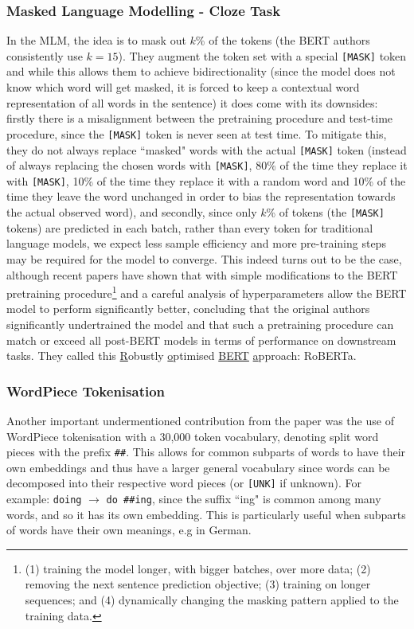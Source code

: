 {{\subsubsection{Masked Language Modelling - Cloze Task}
In the MLM, the idea is to mask out $k$\% of the tokens (the BERT authors consistently use $k=15$). They augment the token set with a special \texttt{[MASK]} token and while this allows them to achieve bidirectionality (since the model does not know which word will get masked, it is forced to keep a contextual word representation of all words in the sentence) it does come with its downsides: firstly there is a misalignment between the pretraining procedure and test-time procedure, since the \texttt{[MASK]} token is never seen at test time. To mitigate this, they do not always replace ``masked" words with the actual \texttt{[MASK]} token (instead of always replacing the chosen words with \texttt{[MASK]}, 80\% of the time they replace it with \texttt{[MASK]}, 10\% of the time they replace it with a random word and 10\% of the time they leave the word unchanged in order to bias the representation towards the actual observed word), and secondly, since only $k$\% of tokens (the \texttt{[MASK]} tokens) are predicted in each batch, rather than every token for traditional language models, we expect less sample efficiency and more pre-training steps may be required for the model to converge. This indeed turns out to be the case, although recent papers \cite{Liu2019} have shown that with simple modifications to the BERT pretraining procedure\footnote{(1) training the model longer, with bigger batches, over more data; (2) removing the next sentence prediction objective; (3) training on longer sequences; and (4) dynamically changing the masking pattern applied to the training data.} and a careful analysis of hyperparameters allow the BERT model to perform significantly better, concluding that the original authors significantly undertrained the model and that such a pretraining procedure can match or exceed all post-BERT models in terms of performance on downstream tasks. They called this \underline{R}obustly \underline{o}ptimised \underline{BERT} \underline{a}pproach: RoBERTa.

\subsubsection{WordPiece Tokenisation}
Another important undermentioned contribution from the paper was the use of WordPiece tokenisation \cite{Wu2016} with a 30,000 token vocabulary, denoting split word pieces with the prefix \texttt{\#\#}. This allows for common subparts of words to have their own embeddings and thus have a larger general vocabulary since words can be decomposed into their respective word pieces (or \texttt{[UNK]} if unknown). For example: \texttt{doing} $\rightarrow$ \texttt{do \#\#ing}, since the suffix ``ing" is common among many words, and so it has its own embedding. This is particularly useful when subparts of words have their own meanings, e.g in German.

}}
